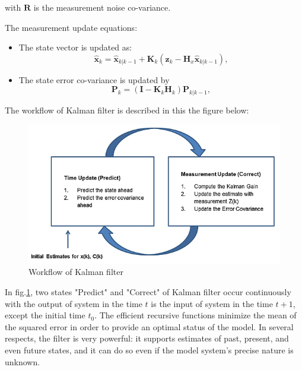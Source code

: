 with $\textbf{R}$ is the measurement noise co-variance.\par
The measurement update equations:
\begin{itemize}
    \item The state vector is updated as:
        \begin{equation}
                      \hat{\textbf{x}}_k = \hat{\textbf{x}}_{k|k-1} + \textbf{K}_k(\textbf{z}_k - \textbf{H}_x\hat{\textbf{x}}_{k|k-1}), 
        \end{equation}
    \item The state error co-variance is updated by
        \begin{equation}
                      \textbf{P}_k = (\textbf{I} -  \textbf{K}_k\textbf{H}_k)\textbf{P}_{k|k-1}, 
        \end{equation}
\end{itemize}
\pagebreak
\hspace{0.5cm}The workflow of Kalman filter is described in this the figure below:
\begin{figure}[h!]
    \centering
    \includegraphics[scale=0.7]{Chapters/Fig/kal_dig_2.png}
    \caption{Workflow of Kalman filter}
    \label{fig:kalman_wf}
\end{figure}
\par
In fig.\ref{fig:kalman_wf}, two states "Predict" and "Correct" of Kalman filter occur continuously with the output of system in the time $t$ is the input of system in the time $t+1$, except the initial time $t_0$. The efficient recursive functions minimize the mean of the squared error in order to provide an optimal status of the model. In several respects, the filter is very powerful: it supports estimates of past, present, and even future states, and it can do so even if the model system's precise nature is unknown.

